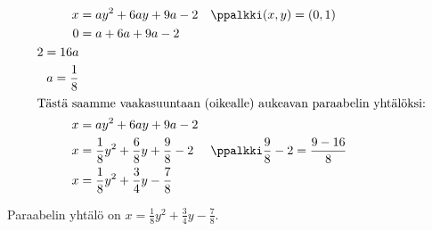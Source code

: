 \begin{esimerkki}
\begin{esimratk}
        \begin{align*}
        x &= ay^2 +6ay +9a -2 && \ppalkki (x,y) = (0,1) \\
        0 &= a +6a +9a -2 \\
        2 = 16a \\
        a = \frac{1}{8}\\
        \intertext{Tästä saamme vaakasuuntaan (oikealle) aukeavan paraabelin yhtälöksi:}
        x &= ay^2 +6ay +9a -2 \\
        x &= \frac{1}{8}y^2 + \frac{6}{8}y + \frac{9}{8} -2  && \ppalkki \frac{9}{8} -2 = \frac{9 - 16}{8}\\
        x &= \frac{1}{8}y^2 + \frac{3}{4}y - \frac{7}{8}
        \end{align*}
    \end{esimratk}
    \begin{esimvast} %
        Paraabelin yhtälö on $x = \frac{1}{8}y^2 + \frac{3}{4}y - \frac{7}{8}$.
    \end{esimvast}
\end{esimerkki}


